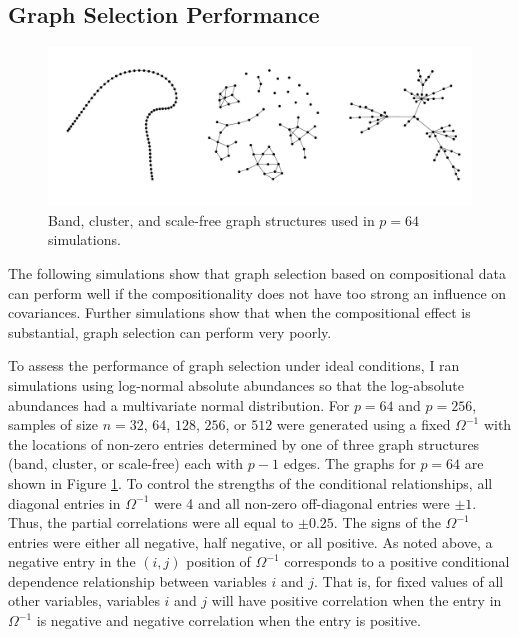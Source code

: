 \documentclass[12pt]{article}
\begin{document}
\subsection*{Graph Selection Performance}

\begin{figure}
\caption{Band, cluster, and scale-free graph structures used in $p = 64$ simulations.}
\label{f:graphs}
\begin{center}
\includegraphics[width=6.5in]{figs/graphs-64.pdf}
\end{center}
\end{figure}

The following simulations show that graph selection based on compositional data can perform well if the compositionality does not have too strong an influence on covariances. Further simulations show that when the compositional effect is substantial, graph selection can perform very poorly.

To assess the performance of graph selection under ideal conditions, I ran simulations using log-normal absolute abundances so that the log-absolute abundances had a multivariate normal distribution. For $p = 64$ and $p = 256$, samples of size $n = 32$, $64$, $128$, $256$, or $512$ were generated using a fixed $\Omega^{-1}$ with the locations of non-zero entries determined by one of three graph structures (band, cluster, or scale-free) each with $p-1$ edges. The graphs for $p = 64$ are shown in Figure \ref{f:graphs}. To control the strengths of the conditional relationships, all diagonal entries in $\Omega^{-1}$ were 4 and all non-zero off-diagonal entries were $\pm 1$. Thus, the partial correlations were all equal to $\pm 0.25$. The signs of the $\Omega^{-1}$ entries were either all negative, half negative, or all positive. As noted above, a negative entry in the $(i,j)$ position of $\Omega^{-1}$ corresponds to a positive conditional dependence relationship between variables $i$ and $j$. That is, for fixed values of all other variables, variables $i$ and $j$ will have positive correlation when the entry in $\Omega^{-1}$ is negative and negative correlation when the entry is positive.
\end{document}
